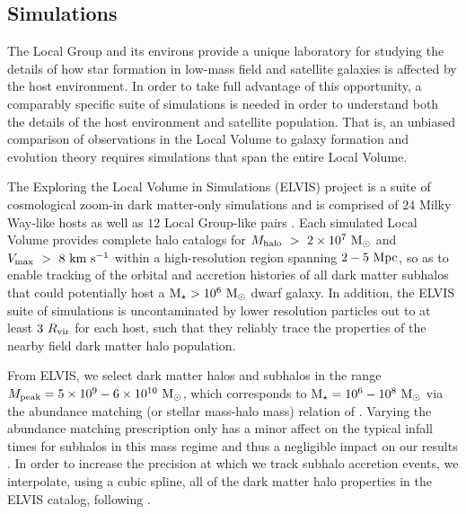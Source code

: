 \subsection{Simulations}
\label{subsec:simdata}

The Local Group and its environs provide a unique laboratory for studying the
details of how star formation in low-mass field and satellite galaxies is
affected by the host environment.  In order to take full advantage of this
opportunity, a comparably specific suite of simulations is needed in order to
understand both the details of the host environment and satellite population.
That is, an unbiased comparison of observations in the Local Volume to galaxy
formation and evolution theory requires simulations that span the entire Local
Volume.
%

The Exploring the Local Volume in Simulations (ELVIS) project is a
suite of cosmological zoom-in dark matter-only simulations and is
comprised of $24$ Milky Way-like hosts as well as $12$ Local Group-like
pairs \citep{GK14}.
%
Each simulated Local Volume provides complete halo catalogs for
${M}_{\rm{halo}}~>~2\times 10^{7}~{\rm M}_{\odot}$ and $V_{\rm{max}}~>~8~{\rm km}~{\rm s}^{-1}$ within a
high-resolution region spanning $2-5~{\rm Mpc}$, so as to enable tracking of the
orbital and accretion histories of all dark matter subhalos that could
potentially host a ${\rm M}_{\star} > 10^{6}~{\rm M}_{\odot}$ dwarf galaxy. In addition, the ELVIS
suite of simulations is uncontaminated by lower resolution particles out to at
least $3~R_{\rm{vir}}$ for each host, such that they reliably trace the properties of
the nearby field dark matter halo population.



From ELVIS, we select dark matter halos and subhalos in the range
${M}_{\rm{peak}} = 5\times 10^{9} - 6\times 10^{10}~{\rm M}_{\odot}$, which corresponds to
${\rm M}_{\star} = 10^{6} - 10^{8}~{\rm M}_{\odot}$ via the abundance matching (or stellar
mass-halo mass) relation of \citet{GK14}.
%
Varying the abundance matching prescription only has a minor affect on the
typical infall times for subhalos in this mass regime and thus a
negligible impact on our results \citep{fham15}. 
%
In order to increase the precision at which we track subhalo accretion events,
we interpolate, using a cubic spline, all of the dark matter halo
properties in the ELVIS catalog, following \citet{fham15}.
%


